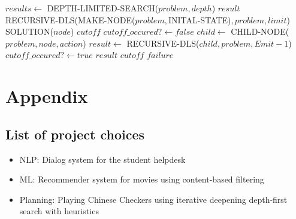 \documentclass[a4paper,11pt]{report}
\begin{document}
\begin{algorithmic}
\State $results \gets$ DEPTH-LIMITED-SEARCH($problem, depth$)
\State \Return $result$
\EndIf
\EndFor
\EndFunction
\\
\State \Return RECURSIVE-DLS(MAKE-NODE($problem, $INITAL-STATE)$,problem, limit$)
\EndFunction
\\
\State \Return SOLUTION($node$)
\State \Return $cutoff$
\Else
\State $cutoff\_occured? \gets false$
\State $child \gets$ CHILD-NODE($problem, node, action$)
\State $result \gets$ RECURSIVE-DLS($child, problem, Emit - 1$)
\State $cutoff\_occured? \gets true$
\State \Return $result$
\EndIf
\EndFor
{}
\Return $cutoff$
\Else
\Return $failure$
\EndIf
\EndIf
\EndFunction
\end{algorithmic}




\chapter{Appendix}
\section{List of project choices}
\begin{itemize}
\item NLP: Dialog system for the student helpdesk 
\item ML: Recommender system for movies using content-based filtering
\item Planning: Playing Chinese Checkers using iterative deepening depth-first search with heuristics
\end{itemize}






\end{document}
